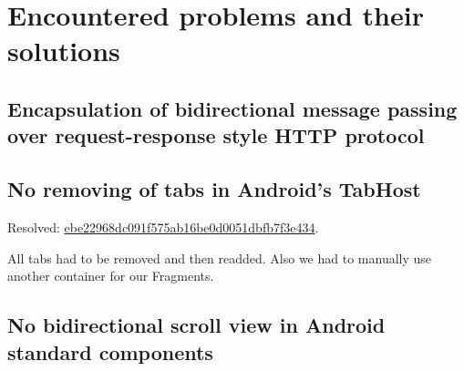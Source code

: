 
\section{Encountered problems and their solutions}
\label{sec:impl-problems}

\subsection{Encapsulation of bidirectional message passing over request-response style HTTP protocol}
\label{subsec:problem-longpolling}


\subsection{No removing of tabs in Android's TabHost}
\label{subsec:problem-tabhost}


Resolved: \href{https://github.com/michalrus/agh-mindmap/commit/ebe22968dc091f575ab16be0d0051dbfb7f3e434}{ebe22968dc091f575ab16be0d0051dbfb7f3e434}.

All tabs had to be removed and then readded. Also we had to manually use another container for our Fragments.

\subsection{No bidirectional scroll view in Android standard components}
\label{subsec:problem-scrollview}

